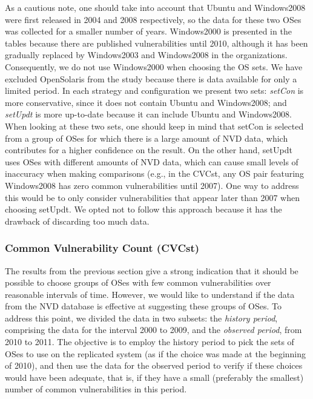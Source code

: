 As a cautious note, one should take into account that Ubuntu and Windows2008 were first released in 2004 and 2008 respectively, so the data for these two OSes was collected for a smaller number of years. Windows2000 is presented in the tables because there are published vulnerabilities until 2010, although it has been gradually  replaced by Windows2003 and Windows2008 in the organizations. Consequently, we do not use Windows2000 when choosing the OS sets. We have excluded OpenSolaris from the study because there is data available for only a limited period. In each strategy and configuration we present two sets: \emph{setCon} is more conservative, since it does not contain Ubuntu and Windows2008; and \emph{setUpdt} is more up-to-date because it can include Ubuntu and Windows2008. When looking at these two sets, one should keep in mind that setCon is selected from a group of OSes for which there is a large amount of NVD data, which contributes for a higher confidence on the result. On the other hand, setUpdt uses OSes with different amounts of NVD data, which can cause small levels of inaccuracy when making comparisons (e.g., in the CVCst, any OS pair featuring Windows2008 has zero common vulnerabilities until 2007). One way to address this would be to only consider vulnerabilities that appear later than 2007 when choosing setUpdt. We opted not to follow this approach because it has the drawback of discarding too much data.


\subsubsection*{Common Vulnerability Count (CVCst)} The results from the previous section give a strong indication that it should be possible to choose groups of OSes with few common vulnerabilities over reasonable intervals of time. However, we would like to understand if the data from the NVD database is effective at suggesting these groups of OSes. To address this point, we divided the data in two subsets: the \emph{history period}, comprising the data for the interval 2000 to 2009, and the \emph{observed period}, from 2010 to 2011. The objective is to employ the history period to pick the sets of OSes to use on the replicated system (as if the choice was made at the beginning of 2010), and then use the data for the observed period to verify if these choices would have been adequate, that is, if they have a small (preferably the smallest) number of common vulnerabilities in this period.

